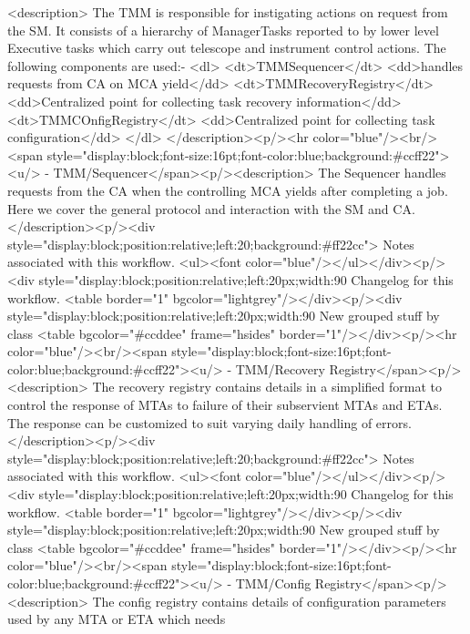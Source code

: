     <description>
      The TMM is responsible for instigating actions on request from the SM. It consists of a hierarchy
      of ManagerTasks reported to by lower level Executive tasks which carry out telescope and instrument
      control actions. 
      The following components are used:-
      <dl>
	<dt>TMMSequencer</dt>
	<dd>handles requests from CA on MCA yield</dd>
	<dt>TMMRecoveryRegistry</dt>
	<dd>Centralized point for collecting task recovery information</dd>
	<dt>TMMCOnfigRegistry</dt>
	<dd>Centralized point for collecting task configuration</dd>
      </dl>
    </description><p/><hr color="blue"/><br/><span style="display:block;font-size:16pt;font-color:blue;background:#ccff22"><u/> -    TMM/Sequencer</span><p/><description>
	The Sequencer handles requests from the CA when the controlling MCA yields after completing a job.
	Here we cover the general protocol and interaction with the SM and CA.
      </description><p/><div style="display:block;position:relative;left:20;background:#ff22cc">
      Notes associated with this workflow.
      <ul><font color="blue"/></ul></div><p/><div style="display:block;position:relative;left:20px;width:90%
      Changelog for this workflow.
      <table border="1" bgcolor="lightgrey"/></div><p/><div style="display:block;position:relative;left:20px;width:90%
     New grouped stuff by class
     <table bgcolor="#ccddee" frame="hsides" border="1"/></div><p/><hr color="blue"/><br/><span style="display:block;font-size:16pt;font-color:blue;background:#ccff22"><u/> -    TMM/Recovery Registry</span><p/><description>
	The recovery registry contains details in a simplified format to control the response of MTAs to
	failure of their subservient MTAs and ETAs. The response can be customized to suit varying daily
	handling of errors.
      </description><p/><div style="display:block;position:relative;left:20;background:#ff22cc">
      Notes associated with this workflow.
      <ul><font color="blue"/></ul></div><p/><div style="display:block;position:relative;left:20px;width:90%
      Changelog for this workflow.
      <table border="1" bgcolor="lightgrey"/></div><p/><div style="display:block;position:relative;left:20px;width:90%
     New grouped stuff by class
     <table bgcolor="#ccddee" frame="hsides" border="1"/></div><p/><hr color="blue"/><br/><span style="display:block;font-size:16pt;font-color:blue;background:#ccff22"><u/> -    TMM/Config Registry</span><p/><description>
	The config registry contains details of configuration parameters used by any MTA or ETA which needs
